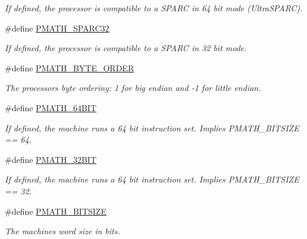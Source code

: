\begin{CompactItemize}
\begin{CompactList}\small\item\em If defined, the processor is compatible to a SPARC in 64 bit mode (UltraSPARC). \item\end{CompactList}\item 
\hypertarget{group__macros_gdcc5778e4b1f726d4095e85e236f69b9}{
\#define \hyperlink{group__macros_gdcc5778e4b1f726d4095e85e236f69b9}{PMATH\_\-SPARC32}}
\label{group__macros_gdcc5778e4b1f726d4095e85e236f69b9}

\begin{CompactList}\small\item\em If defined, the processor is compatible to a SPARC in 32 bit mode. \item\end{CompactList}\item 
\hypertarget{group__macros_g4657dabaf0be66559124021eb085868f}{
\#define \hyperlink{group__macros_g4657dabaf0be66559124021eb085868f}{PMATH\_\-BYTE\_\-ORDER}}
\label{group__macros_g4657dabaf0be66559124021eb085868f}

\begin{CompactList}\small\item\em The processors byte ordering: 1 for big endian and -1 for little endian. \item\end{CompactList}\item 
\hypertarget{group__macros_g7eb592a3b958705ba1ebcdda56cbcb30}{
\#define \hyperlink{group__macros_g7eb592a3b958705ba1ebcdda56cbcb30}{PMATH\_\-64BIT}}
\label{group__macros_g7eb592a3b958705ba1ebcdda56cbcb30}

\begin{CompactList}\small\item\em If defined, the machine runs a 64 bit instruction set. Implies PMATH\_\-BITSIZE == 64. \item\end{CompactList}\item 
\hypertarget{group__macros_g45ee5807e2401c298dc2b66230d4ea6a}{
\#define \hyperlink{group__macros_g45ee5807e2401c298dc2b66230d4ea6a}{PMATH\_\-32BIT}}
\label{group__macros_g45ee5807e2401c298dc2b66230d4ea6a}

\begin{CompactList}\small\item\em If defined, the machine runs a 64 bit instruction set. Implies PMATH\_\-BITSIZE == 32. \item\end{CompactList}\item 
\hypertarget{group__macros_gd88ce1a49c331f470275a1eea803ebf4}{
\#define \hyperlink{group__macros_gd88ce1a49c331f470275a1eea803ebf4}{PMATH\_\-BITSIZE}}
\label{group__macros_gd88ce1a49c331f470275a1eea803ebf4}

\begin{CompactList}\small\item\em The machines word size in bits. \item\end{CompactList}\end{CompactItemize}
